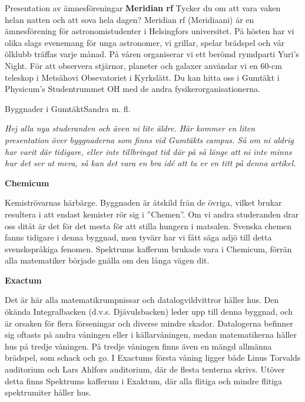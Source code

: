 \documentclass{spektraklet}
\begin{document}
\begin{artikel}{Presentation av ämnesföreningar}{}
\textbf{Meridian rf}
Tycker du om att vara vaken helan natten och att sova hela dagen? Meridian rf
(Meridiaani) är en ämnesförening för astronomistudenter i Helsingfors universitet. På hösten
har vi olika slags evenemang för unga astronomer, vi grillar, spelar brädspel och vår ölklubb träffas varje månad. På våren organiserar vi ett berömd rymdparti Yuri's Night. För att observera stjärnor, planeter och galaxer användar vi en 60-cm teleskop i Metsähovi
Obsevatoriet i Kyrkslätt. Du kan hitta oss i Gumtäkt i Physicum's Studentrummet OH med de
andra fysikerorganisationerna.

\end{artikel}

\begin{artikel}{Byggnader i Gumtäkt}{Sandra m. fl.}

\textit{Hej alla nya studeranden och även ni lite äldre. Här kommer en liten presentation över byggnaderna som finns vid Gumtäkts campus. Så om ni aldrig har varit där tidigare,
eller inte tillbringat tid där på så länge att ni inte minns hur det ser ut mera, så kan
det vara en bra idé att ta er en titt på denna artikel.}


\textbf{Chemicum}

Kemiströvarnas härbärge. Byggnaden är åtskild från de övriga, vilket brukar resultera i att endast kemister rör sig i ”Chemen”. Om vi andra studeranden drar oss ditåt är det för det mesta för att stilla hungern i matsalen. Svenska chemen fanns tidigare i denna byggnad, men tyvärr har vi fått säga adjö till detta svenskspråkiga fenomen. Spektrums kafferum brukade vara i Chemicum, förrän alla matematiker började gnälla om den långa vägen dit.


\textbf{Exactum}

Det är här alla matematikrumpnissar och datalogvildvittror håller hus. Den ökända Integralbacken (d.v.s. Djävulsbacken) leder upp till denna byggnad, och är orsaken för flera förseningar och diverse mindre skador. Datalogerna befinner sig oftasts på andra våningen eller i källarvåningen, medan matematikerna håller hus på tredje våningen. På tredje våningen finns även en mängd allmänna brädspel, som schack och go. I Exactums första våning ligger både Linus Torvalds auditorium och Lars Ahlfors auditorium, där de flesta tenterna skrivs. Utöver detta finns Spektrums kafferum i Exaktum, där alla flitiga och mindre flitiga spektrumiter håller hus.


\end{artikel}
\end{document}
